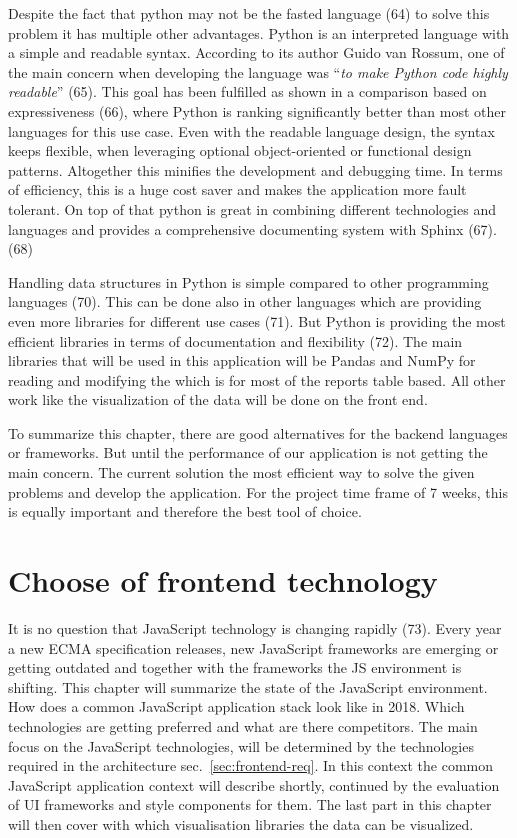 \documentclass[american,a4paper,oneside,,tablecaptionabove]{scrbook}
\begin{document}
Despite the fact that python may not be the fasted language (64) to
solve this problem it has multiple other advantages. Python is an
interpreted language with a simple and readable syntax. According to its
author Guido van Rossum, one of the main concern when developing the
language was \enquote{\emph{to make Python code highly readable}} (65).
This goal has been fulfilled as shown in a comparison based on
expressiveness (66), where Python is ranking significantly better than
most other languages for this use case. Even with the readable language
design, the syntax keeps flexible, when leveraging optional
object-oriented or functional design patterns. Altogether this minifies
the development and debugging time. In terms of efficiency, this is a
huge cost saver and makes the application more fault tolerant. On top of
that python is great in combining different technologies and languages
and provides a comprehensive documenting system with Sphinx (67). (68)

Handling data structures in Python is simple compared to other
programming languages (70). This can be done also in other languages
which are providing even more libraries for different use cases (71).
But Python is providing the most efficient libraries in terms of
documentation and flexibility (72). The main libraries that will be used
in this application will be Pandas and NumPy for reading and modifying
the which is for most of the reports table based. All other work like
the visualization of the data will be done on the front end.

To summarize this chapter, there are good alternatives for the backend
languages or frameworks. But until the performance of our application is
not getting the main concern. The current solution the most efficient
way to solve the given problems and develop the application. For the
project time frame of 7 weeks, this is equally important and therefore
the best tool of choice.

\section{Choose of frontend
technology}\label{choose-of-frontend-technology}

It is no question that JavaScript technology is changing rapidly (73).
Every year a new ECMA specification releases, new JavaScript frameworks
are emerging or getting outdated and together with the frameworks the JS
environment is shifting. This chapter will summarize the state of the
JavaScript environment. How does a common JavaScript application stack
look like in 2018. Which technologies are getting preferred and what are
there competitors. The main focus on the JavaScript technologies, will
be determined by the technologies required in the architecture
sec.~\ref{sec:frontend-req}. In this context the common JavaScript
application context will describe shortly, continued by the evaluation
of UI frameworks and style components for them. The last part in this
chapter will then cover with which visualisation libraries the data can
be visualized.
\end{document}
